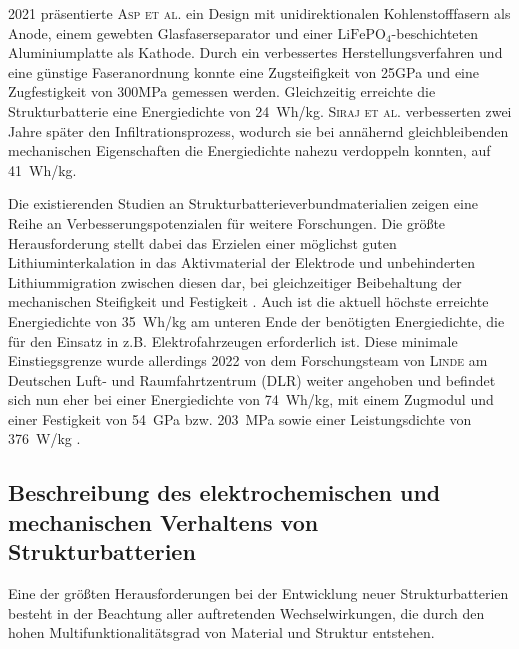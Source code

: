 2021 präsentierte \textsc{Asp et al.} \cite{Asp2021} ein Design mit unidirektionalen Kohlenstofffasern als Anode, einem gewebten Glasfaserseparator und einer $\text{LiFePO}_\text{4}$-beschichteten Aluminiumplatte als Kathode. Durch ein verbessertes Herstellungsverfahren und eine günstige Faseranordnung konnte eine Zugsteifigkeit von 25GPa und eine Zugfestigkeit von 300MPa gemessen werden. Gleichzeitig erreichte die Strukturbatterie eine Energiedichte von 24~Wh/kg. \textsc{Siraj et al.} \cite{Siraj2023} verbesserten zwei Jahre später den Infiltrationsprozess, wodurch sie bei annähernd gleichbleibenden mechanischen Eigenschaften die Energiedichte nahezu verdoppeln konnten, auf 41~Wh/kg.



Die existierenden Studien an Strukturbatterieverbundmaterialien zeigen eine Reihe an Verbesserungspotenzialen für weitere Forschungen. Die größte Herausforderung stellt dabei das Erzielen einer möglichst guten Lithiuminterkalation in das Aktivmaterial der Elektrode und unbehinderten Lithiummigration zwischen diesen dar, bei gleichzeitiger Beibehaltung der mechanischen Steifigkeit und Festigkeit \cite{Asp2015}. Auch ist die aktuell höchste erreichte Energiedichte von 35~Wh/kg am unteren Ende der benötigten Energiedichte, die für den Einsatz in z.B. Elektrofahrzeugen erforderlich ist. Diese minimale Einstiegsgrenze wurde allerdings 2022 von dem Forschungsteam von \textsc{Linde} am Deutschen Luft- und Raumfahrtzentrum (DLR) weiter angehoben und befindet sich nun eher bei einer Energiedichte von 74~Wh/kg, mit einem Zugmodul und einer Festigkeit von 54~GPa bzw. 203~MPa sowie einer Leistungsdichte von 376~W/kg \cite{Ishfaq2022}.

\subsection{Beschreibung des elektrochemischen und mechanischen Verhaltens von Strukturbatterien}

Eine der größten Herausforderungen bei der Entwicklung neuer Strukturbatterien besteht in der Beachtung aller auftretenden Wechselwirkungen, die durch den hohen Multifunktionalitätsgrad von Material und Struktur entstehen.

